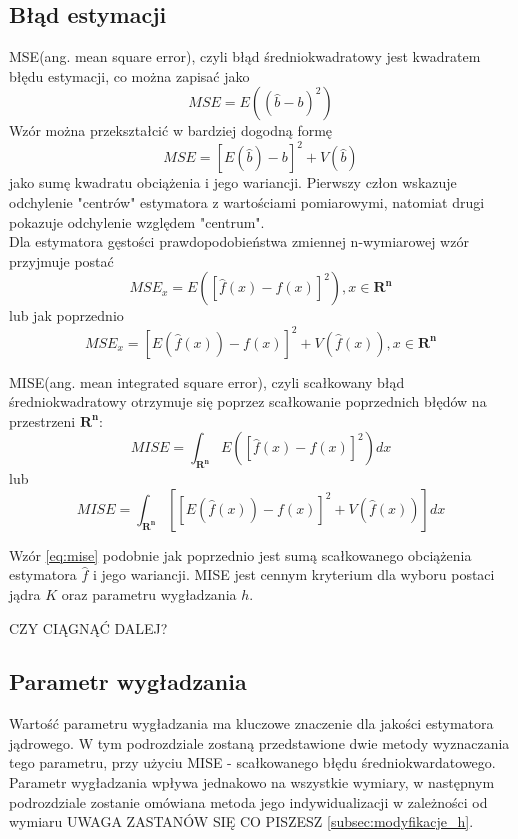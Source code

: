 \subsection{Błąd estymacji}
MSE(ang. mean square error), czyli błąd średniokwadratowy jest kwadratem błędu estymacji, co można zapisać jako
\begin{equation}
MSE = E({(\hat{b}-b)}^2 )
\end{equation}
Wzór można przekształcić w bardziej dogodną formę
\begin{equation}
MSE = {[E(\hat{b})-b]}^2 +V(\hat{b})
\end{equation}
jako sumę kwadratu obciążenia i jego wariancji. Pierwszy człon wskazuje odchylenie "centrów" estymatora z wartościami pomiarowymi, natomiat drugi pokazuje odchylenie względem "centrum". \\
Dla estymatora gęstości prawdopodobieństwa zmiennej n-wymiarowej wzór przyjmuje postać
\begin{equation}
MSE_x = E({[\hat{f}(x)-f(x)]}^2), x \in \mathbf{R^n}
\end{equation}
lub jak poprzednio
\begin{equation}
MSE_x = {[E(\hat{f}(x))-f(x)]}^2 + V(\hat{f}(x)), x \in \mathbf{R^n}
\end{equation}

MISE(ang. mean integrated square error), czyli scałkowany błąd średniokwadratowy otrzymuje się poprzez scałkowanie poprzednich błędów na przestrzeni $\mathbf{R^n}$:
\begin{equation}
MISE = \int_{\mathbf{R^n}} E({[\hat{f}(x)-f(x)]}^2) dx
\end{equation}
lub
\begin{equation}
\label{eq:mise}
MISE = \int_{\mathbf{R^n}} [{[E(\hat{f}(x))-f(x)]}^2 + V(\hat{f}(x))]dx
\end{equation}

Wzór \eqref{eq:mise} podobnie jak poprzednio jest sumą scałkowanego obciążenia estymatora $\hat{f}$ i jego wariancji. MISE jest cennym kryterium dla wyboru postaci jądra $K$ oraz parametru wygładzania $h$.

CZY CIĄGNĄĆ DALEJ? 

\subsection{Parametr wygładzania}

Wartość parametru wygładzania ma kluczowe znaczenie dla jakości estymatora jądrowego. W tym podrozdziale zostaną przedstawione dwie metody wyznaczania tego parametru, przy użyciu MISE - scałkowanego błędu średniokwardatowego. Parametr wygładzania wpływa jednakowo na wszystkie wymiary, w następnym podrozdziale zostanie omówiana metoda jego indywidualizacji w zależności od wymiaru UWAGA ZASTANÓW SIĘ CO PISZESZ \ref{subsec:modyfikacje_h}.

